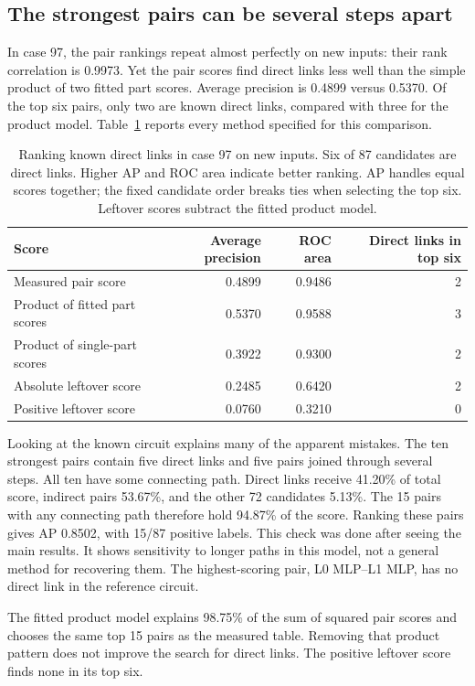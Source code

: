 \documentclass[11pt]{article}
\begin{document}
\subsection{The strongest pairs can be several steps apart}
In case 97, the pair rankings repeat almost perfectly on new inputs: their
rank correlation is 0.9973. Yet the pair scores find direct links less well
than the simple product of two fitted part scores. Average precision is
0.4899 versus 0.5370. Of the top six pairs, only two are known direct links,
compared with three for the product model. Table~\ref{tab:gt} reports every
method specified for this comparison.

\begin{table}[t]
\centering
\caption{Ranking known direct links in case 97 on new inputs. Six of 87
candidates are direct links. Higher AP and ROC area indicate better ranking.
AP handles equal scores together; the fixed candidate order breaks ties when
selecting the top six. Leftover scores subtract the fitted product model.}
\label{tab:gt}
\begin{tabular}{lrrr}
\toprule
Score & Average precision & ROC area & Direct links in top six\\
\midrule
Measured pair score & 0.4899 & 0.9486 & 2\\
Product of fitted part scores & 0.5370 & 0.9588 & 3\\
Product of single-part scores & 0.3922 & 0.9300 & 2\\
Absolute leftover score & 0.2485 & 0.6420 & 2\\
Positive leftover score & 0.0760 & 0.3210 & 0\\
\bottomrule
\end{tabular}
\end{table}

Looking at the known circuit explains many of the apparent mistakes. The ten
strongest pairs contain five direct links and five pairs joined through
several steps. All ten have some connecting path. Direct links receive 41.20\%
of total score, indirect pairs 53.67\%, and the other 72 candidates 5.13\%.
The 15 pairs with any connecting path therefore hold 94.87\% of the score.
Ranking these pairs gives AP 0.8502, with 15/87 positive labels. This check
was done after seeing the main results. It shows sensitivity to longer paths
in this model, not a general method for recovering them. The highest-scoring
pair, L0 MLP--L1 MLP, has no direct link in the reference circuit.

The fitted product model explains 98.75\% of the sum of squared pair scores
and chooses the same top 15 pairs as the measured table. Removing that product
pattern does not improve the search for direct links. The positive leftover
score finds none in its top six.
\end{document}
